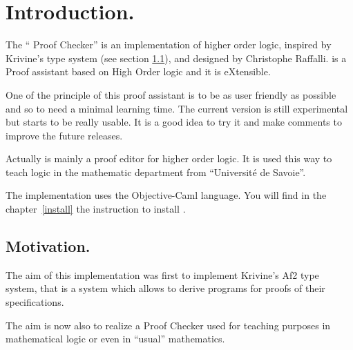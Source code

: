 
\chapter{Introduction.}

The ``\AFD{} Proof Checker'' is an implementation of higher order logic,
inspired by Krivine's type system (see section \ref{motif}), and
designed by Christophe Raffalli.
 \AFD{} is a Proof assistant based on High Order logic and it is
eXtensible.

One of the principle of this proof assistant is to be as
user friendly as possible and so to need a minimal learning time. The
current version is still experimental but starts to be really usable. It
is a good idea to try it and make comments to improve the future
releases.


Actually \AFD{} is  mainly a proof editor
for higher order logic.  It is used this way to teach logic in
the mathematic department from ``Universit\'e de Savoie''.

The implementation uses the Objective-Caml language.  You will find in
the chapter~\ref{install} the instruction to install \AFD.

\section{Motivation.}\label{motif}

The aim of this implementation was first to implement Krivine's Af2
\cite{Kri90,KP90,Par88} type system, that is a system which allows to
derive programs for proofs of their specifications.

The aim is now also to realize a Proof Checker used for teaching
purposes in mathematical logic or even in ``usual'' mathematics.

